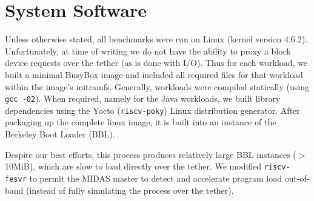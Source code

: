 %

\section{System Software}

Unless otherwise stated, all benchmarks were run on Linux (kernel version
4.6.2). Unfortunately, at time of writing we do not have the ability to proxy a
block device requests over the tether (as is done with I/O). Thus for each
workload, we built a minimal BusyBox image and included all required files for
that workload within the image's initramfs.  Generally, workloads were compiled
statically (using \texttt{gcc -02}). When required, namely for the Java workloads, we
built library dependencies using the Yocto (\texttt{riscv-poky}) Linux
distribution generator. After packaging up the complete linux image, it is
built into an instance of the Berkeley Boot Loader (BBL).

Despite our best efforts, this process produces relatively large BBL instances
($>$ 10MiB), which are slow to load directly over the tether.  We modified
\texttt{riscv-fesvr} to permit the MIDAS master to detect and accelerate program load
out-of-band (instead of fully simulating the process over the tether).

